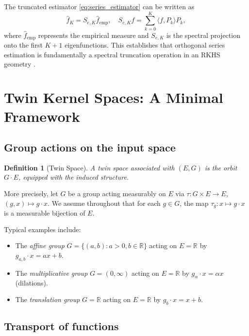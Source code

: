 \documentclass[11pt,a4paper]{article}
\newtheorem{definition}[theorem]{Definition}
\newcommand{\R}{\mathbb{R}}
\newcommand{\ip}[2]{\langle #1, #2 \rangle}
\begin{document}
The truncated estimator \eqref{eq:series_estimator} can be written as
\[
\hat{f}_K = S_{e,K} \hat{f}_{\mathrm{emp}}, \quad S_{e,K} f = \sum_{k=0}^{K} \ip{f}{P_k} P_k,
\]
where $\hat{f}_{\mathrm{emp}}$ represents the empirical measure and $S_{e,K}$ is the spectral projection onto the first $K+1$ eigenfunctions. This establishes that orthogonal series estimation is fundamentally a spectral truncation operation in an RKHS geometry \citep{Berlinet2004,Cucker2002}.

\section{Twin Kernel Spaces: A Minimal Framework}\label{sec:twin}

\subsection{Group actions on the input space}

\begin{definition}[Twin Space]\label{def:twin_space}
A \emph{twin space} associated with $(E, G)$ is the orbit $G \cdot E$, equipped with the induced structure.
\end{definition}

More precisely, let $G$ be a group acting measurably on $E$ via $\tau : G \times E \to E$, $(g, x) \mapsto g \cdot x$. We assume throughout that for each $g \in G$, the map $\tau_g : x \mapsto g \cdot x$ is a measurable bijection of $E$.

Typical examples include:
\begin{itemize}
\item The \emph{affine group} $G = \{(a, b) : a > 0, b \in \R\}$ acting on $E = \R$ by $g_{a,b} \cdot x = ax + b$.
\item The \emph{multiplicative group} $G = (0, \infty)$ acting on $E = \R$ by $g_\alpha \cdot x = \alpha x$ (dilations).
\item The \emph{translation group} $G = \R$ acting on $E = \R$ by $g_b \cdot x = x + b$.
\end{itemize}

\subsection{Transport of functions}
\end{document}
